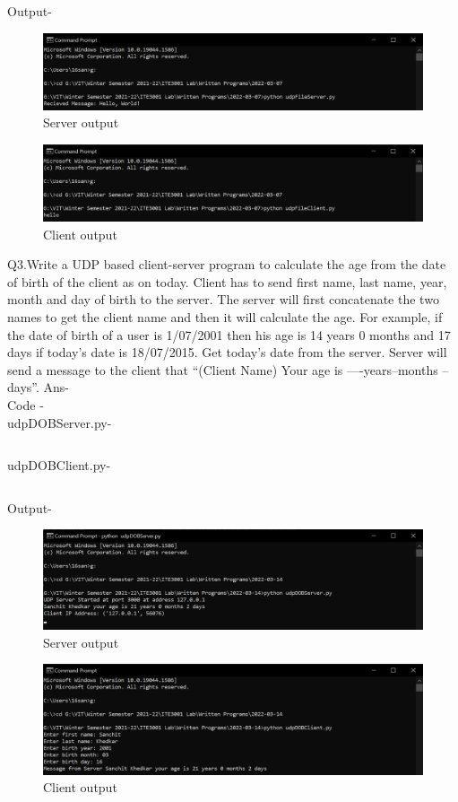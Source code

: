 \documentclass[12pt]{article}
\begin{document}
\newpage
Output-
\begin{figure}[h] %
\centering
\includegraphics[width=\textwidth]{udpFileServer.png}
\caption{Server output}
\end{figure}
\begin{figure}[h] %
\centering
\includegraphics[width=\textwidth]{udpFileClient.png}
\caption{Client output}
\end{figure}
\newpage
Q3.Write a UDP based client-server program to calculate the age from the date of birth of the client as on today. Client has to send first name, last name, year, month and day of birth to the server. The server will first concatenate the two names to get the client name and then it will calculate the age. For example, if the date of birth of a user is 1/07/2001 then his age is 14 years 0 months and 17 days if today's date is 18/07/2015. Get today's date from the server. Server will send a message to the client that “(Client Name) Your age is ----years--months --days”.
Ans- \\ Code - \\ udpDOBServer.py-\inputminted{python}{udpDOBServer.py}
udpDOBClient.py- \inputminted{python}{udpDOBClient.py}
Output-
\begin{figure}[h] %
\centering
\includegraphics[width=\textwidth]{udpDOBServer.png}
\caption{Server output}
\end{figure}
\begin{figure}[h] %
\centering
\includegraphics[width=\textwidth]{udpDOBClient.png}
\caption{Client output}
\end{figure}
\end{document}
